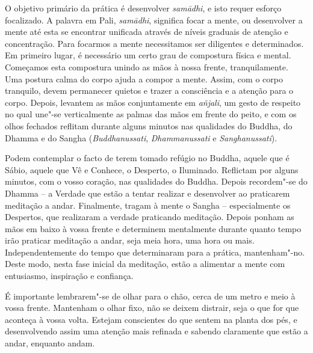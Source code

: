 O objetivo primário da prática é desenvolver \emph{samādhi}, e isto
requer esforço focalizado. A palavra em Pali, \emph{samādhi},
significa focar a mente, ou desenvolver a mente até esta se encontrar
unificada através de níveis graduais de atenção e concentração. Para
focarmos a mente necessitamos ser diligentes e determinados. Em primeiro
lugar, é necessário um certo grau de compostura física e mental.
Começamos esta compostura unindo as mãos à nossa frente, tranquilamente.
Uma postura calma do corpo ajuda a compor a mente. Assim, com o corpo
tranquilo, devem permanecer quietos e trazer a consciência e a atenção
para o corpo. Depois, levantem as mãos conjuntamente em \emph{añjali},
um gesto de respeito no qual une"-se verticalmente as palmas das mãos em
frente do peito, e com os olhos fechados reflitam durante alguns minutos
nas qualidades do Buddha, do Dhamma e do Sangha
(\emph{Buddhanussati}, \emph{Dhammanussati} e \emph{Sanghanussati}).

Podem contemplar o facto de terem tomado refúgio no Buddha,
aquele que é Sábio, aquele que Vê e Conhece, o Desperto, o Iluminado.
Reflictam por alguns minutos, com o vosso coração, nas qualidades do
Buddha. Depois recordem"-se do Dhamma -- a Verdade que
estão a tentar realizar e desenvolver ao praticarem meditação a andar.
Finalmente, tragam à mente o Sangha -- especialmente os
Despertos, que realizaram a verdade praticando meditação. Depois ponham
as mãos em baixo à vossa frente e determinem mentalmente durante quanto
tempo irão praticar meditação a andar, seja meia hora, uma hora ou mais.
Independentemente do tempo que determinaram para a prática,
mantenham"-no. Deste modo, nesta fase inicial da meditação, estão a
alimentar a mente com entusiasmo, inspiração e confiança.

É importante lembrarem"-se de olhar para o chão, cerca de um metro e meio
à vossa frente. Mantenham o olhar fixo, não se deixem distrair, seja o
que for que aconteça à vossa volta. Estejam conscientes do que sentem na
planta dos pés, e desenvolvendo assim uma atenção mais refinada e
sabendo claramente que estão a andar, enquanto andam.

